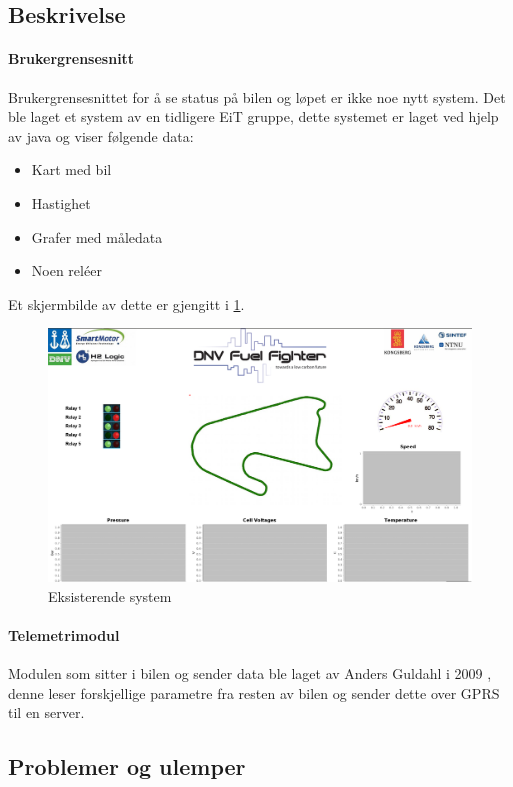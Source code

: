 \subsection{Beskrivelse}

\paragraph{Brukergrensesnitt}
Brukergrensesnittet for å se status på bilen og løpet er ikke noe nytt system. 
Det ble laget et system av en tidligere EiT gruppe, dette systemet er laget ved hjelp av java og viser følgende data:
\begin{itemize}
\item Kart med bil
\item Hastighet
\item Grafer med måledata
\item Noen reléer
\end{itemize}
Et skjermbilde av dette er gjengitt i \ref{fig:gammeljava}.

\begin{figure}[H]
\includegraphics[width=\textwidth]{images/java.png}
\caption{Eksisterende system}
\label{fig:gammeljava}
\end{figure}

\paragraph{Telemetrimodul}
Modulen som sitter i bilen og sender data ble laget av Anders Guldahl i 2009 \cite{telemetrithesis}, denne leser forskjellige parametre fra resten av bilen og sender dette over GPRS til en server.

\subsection{Problemer og ulemper}
